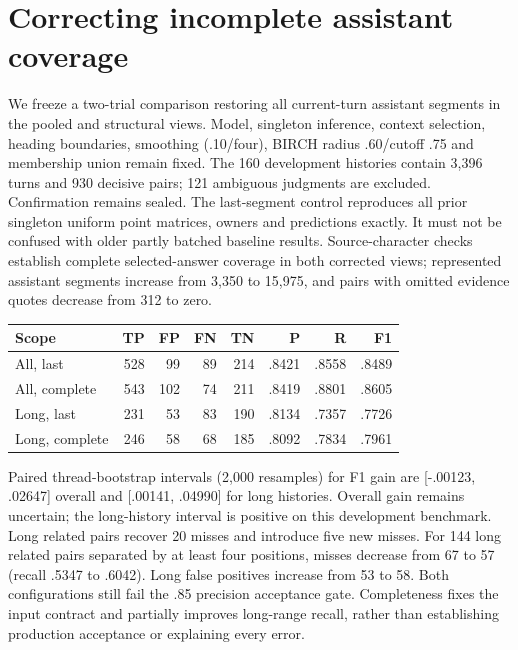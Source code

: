 \documentclass[11pt]{article}
\begin{document}
\section{Correcting incomplete assistant coverage}
We freeze a two-trial comparison restoring all current-turn assistant segments
in the pooled and structural views. Model, singleton inference, context selection,
heading boundaries, smoothing (.10/four), BIRCH radius .60/cutoff .75 and membership
union remain fixed. The 160 development histories contain 3,396 turns and 930
decisive pairs; 121 ambiguous judgments are excluded. Confirmation remains sealed.
The last-segment control reproduces all prior singleton uniform point matrices,
owners and predictions exactly. It must not be confused with older partly batched
baseline results. Source-character checks establish complete selected-answer
coverage in both corrected views; represented assistant segments increase from
3,350 to 15,975, and pairs with omitted evidence quotes decrease from 312 to zero.

\begin{center}
\begin{tabular}{lrrrrrrr}
Scope & TP & FP & FN & TN & P & R & F1\\\hline
All, last & 528 & 99 & 89 & 214 & .8421 & .8558 & .8489\\
All, complete & 543 & 102 & 74 & 211 & .8419 & .8801 & .8605\\
Long, last & 231 & 53 & 83 & 190 & .8134 & .7357 & .7726\\
Long, complete & 246 & 58 & 68 & 185 & .8092 & .7834 & .7961\\
\end{tabular}
\end{center}

Paired thread-bootstrap intervals (2,000 resamples) for F1 gain are
[-.00123, .02647] overall and [.00141, .04990] for long histories. Overall gain
remains uncertain; the long-history interval is positive on this development
benchmark. Long related pairs recover 20 misses and introduce five new misses.
For 144 long related pairs separated by at least four positions, misses decrease
from 67 to 57 (recall .5347 to .6042). Long false positives increase from 53 to 58.
Both configurations still fail the .85 precision acceptance gate. Completeness
fixes the input contract and partially improves long-range recall, rather than
establishing production acceptance or explaining every error.
\end{document}
